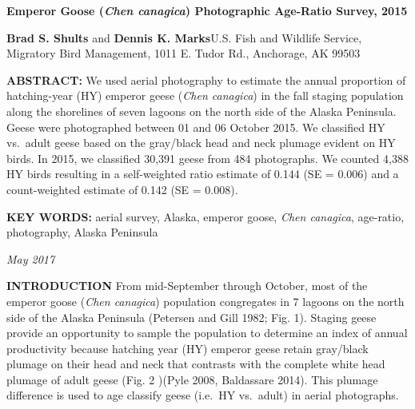\documentclass[]{article}
\title{}
\author{}
\date{}
\begin{document}
\pagestyle{fancy}
\renewcommand{\footrulewidth}{1pt} \renewcommand{\headrulewidth}{0pt}

\textbf{\LARGE{Emperor Goose (\textit{Chen canagica}) Photographic Age-Ratio Survey, 2015}}
\hfill

 \normalsize
\textbf{Brad S. Shults} and \textbf{Dennis K. Marks}\newline U.S. Fish
and Wildlife Service, Migratory Bird Management, 1011 E. Tudor Rd.,
Anchorage, AK 99503

\textbf{ABSTRACT:} We used aerial photography to estimate the annual
proportion of hatching-year (HY) emperor geese (\textit{Chen canagica})
in the fall staging population along the shorelines of seven lagoons on
the north side of the Alaska Peninsula. Geese were photographed between
01 and 06 October 2015. We classified HY vs.~adult geese based on the
gray/black head and neck plumage evident on HY birds. In 2015, we
classified 30,391 geese from 484 photographs. We counted 4,388 HY birds
resulting in a self-weighted ratio estimate of 0.144 (SE = 0.006) and a
count-weighted estimate of 0.142 (SE = 0.008).

\textbf{KEY WORDS: }aerial survey, Alaska, emperor goose,
\textit{Chen canagica}, age-ratio, photography, Alaska Peninsula

\hfill\textit {May 2017}

\textbf{INTRODUCTION}\break
From mid-September through October, most of the emperor goose
(\textit{Chen canagica}) population congregates in 7 lagoons on the
north side of the Alaska Peninsula (Petersen and Gill 1982; Fig. 1).
Staging geese provide an opportunity to sample the population to
determine an index of annual productivity because hatching year (HY)
emperor geese retain gray/black plumage on their head and neck that
contrasts with the complete white head plumage of adult geese (Fig. 2
)(Pyle 2008, Baldassare 2014). This plumage difference is used to age
classify geese (i.e.~HY vs.~adult) in aerial photographs.
\end{document}
